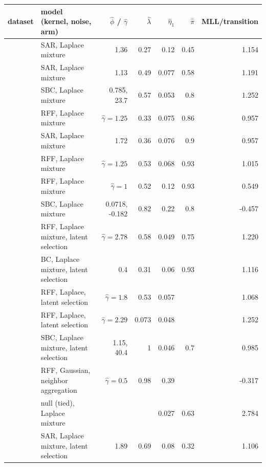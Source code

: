 {\footnotesize\setlength{\tabcolsep}{2pt}
\begin{tabular}{llrrrrr}
\toprule
dataset & model (kernel, noise, arm) & $\hat\phi$ / $\hat\gamma$ & $\hat\lambda$ & $\hat\eta_1$ & $\hat\pi$ & MLL/transition \\
\midrule
\adamsLo{} & SAR, Laplace mixture & 1.36 & 0.27 & 0.12 & 0.45 & 1.154 \\
\adamsMid{} & SAR, Laplace mixture & 1.13 & 0.49 & 0.077 & 0.58 & 1.191 \\
\adamsHi{} & SBC, Laplace mixture & 0.785, 23.7 & 0.57 & 0.053 & 0.8 & 1.252 \\
\takacsCtl{} & RFF, Laplace mixture & $\hat\gamma=1.25$ & 0.33 & 0.075 & 0.86 & 0.957 \\
\takacsDis{} & SAR, Laplace mixture & 1.72 & 0.36 & 0.076 & 0.9 & 0.957 \\
\takacsInt{} & RFF, Laplace mixture & $\hat\gamma=1.25$ & 0.53 & 0.068 & 0.93 & 1.015 \\
\takacsOne{} & RFF, Laplace mixture & $\hat\gamma=1$ & 0.52 & 0.12 & 0.93 & 0.549 \\
\becker{} & SBC, Laplace mixture & 0.0718, -0.182 & 0.82 & 0.22 & 0.8 & -0.457 \\
\vkg{} & RFF, Laplace mixture, latent selection & $\hat\gamma=2.78$ & 0.58 & 0.049 & 0.75 & 1.220 \\
\vkc{} & BC, Laplace mixture, latent selection & 0.4 & 0.31 & 0.06 & 0.93 & 1.116 \\
\senate{} & RFF, Laplace, latent selection & $\hat\gamma=1.8$ & 0.53 & 0.057 &  & 1.068 \\
\house{} & RFF, Laplace, latent selection & $\hat\gamma=2.29$ & 0.073 & 0.048 &  & 1.252 \\
\cmv{} & SBC, Laplace mixture, latent selection & 1.15, 40.4 & 1 & 0.046 & 0.7 & 0.985 \\
\spinos{} & RFF, Gaussian, neighbor aggregation & $\hat\gamma=0.5$ & 0.98 & 0.39 &  & -0.317 \\
\kozitsin{} & null (tied), Laplace mixture &  &  & 0.027 & 0.63 & 2.784 \\
\markets{} & SAR, Laplace mixture, latent selection & 1.89 & 0.69 & 0.08 & 0.32 & 1.106 \\
\bottomrule
\end{tabular}}
